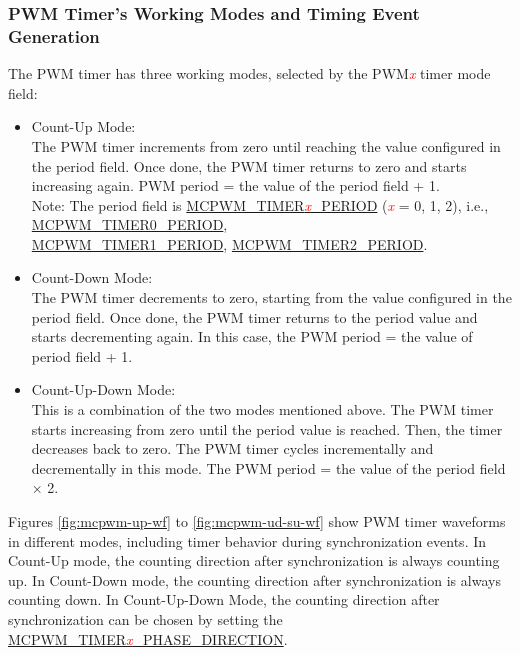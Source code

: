 \documentclass[main\_\_EN.tex]{subfiles}
\begin{document}
\subsubsection{PWM Timer's Working Modes and Timing Event Generation} 
\label{sec:mcpwm-modes-and-event-generation}

The PWM timer has three working modes, selected by the PWM\textcolor{red}{\it{x}} timer mode field: 
\begin{itemize}
    \item Count-Up Mode: \\
    The PWM timer increments from zero until reaching the value configured in the period field. Once done, the PWM timer returns to zero and starts increasing again. PWM period = the value of the period field + 1.\\
    Note: The period field is \hyperref[fielddesc:MCPWMTIMER0PERIOD]{MCPWM\_TIMER\textcolor{red}{\it{x}}\_PERIOD} (\textcolor{red}{\it{x}} = 0, 1, 2), i.e., \hyperref[fielddesc:MCPWMTIMER0PERIOD]{MCPWM\_TIMER0\_PERIOD},\\ \hyperref[fielddesc:MCPWMTIMER1PERIOD]{MCPWM\_TIMER1\_PERIOD}, \hyperref[fielddesc:MCPWMTIMER2PERIOD]{MCPWM\_TIMER2\_PERIOD}.
    \item Count-Down Mode: \\
    The PWM timer decrements to zero, starting from the value configured in the period field. Once done, the PWM timer returns to the period value and starts decrementing again. In this case, the PWM period = the value of period field + 1.
    \item Count-Up-Down Mode: \\
    This is a combination of the two modes mentioned above. The PWM timer starts increasing from zero until the period value is reached. Then, the timer decreases back to zero. The PWM timer cycles incrementally and decrementally in this mode. The PWM period = the value of the period field × 2.
\end{itemize}

Figures \ref{fig:mcpwm-up-wf} to \ref{fig:mcpwm-ud-su-wf} show PWM timer waveforms in different modes, including timer behavior during synchronization events. In Count-Up mode, the counting direction after synchronization is always counting up. In Count-Down mode, the counting direction after synchronization is always counting down. In Count-Up-Down Mode, the counting direction after synchronization can be chosen by setting the \hyperref[fielddesc:MCPWMTIMER0PHASEDIRECTION]{MCPWM\_TIMER\textcolor{red}{\it{x}}\_PHASE\_DIRECTION}.
\end{document}
